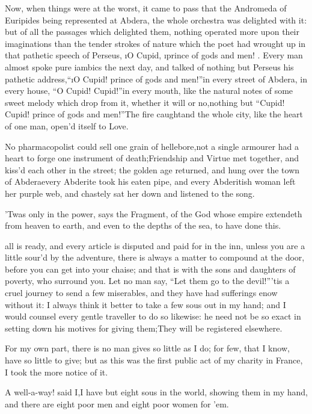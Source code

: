 \documentclass[twoside]{article}
\begin{document}
Now, when things were at the worst, it came to pass that the Andromeda of
Euripides being represented at Abdera, the whole orchestra was delighted
with it: but of all the passages which delighted them, nothing operated
more upon their imaginations than the tender strokes of nature which the
poet had wrought up in that pathetic speech of Perseus, \i{O Cupid},
\i{prince of gods and men}! \etc.  Every man almost spoke pure iambics the
next day, and talked of nothing but Perseus his pathetic address,\tsk “\i{O
Cupid! prince of gods and men}!”\tsk in every street of Abdera, in every
house, “O Cupid!  Cupid!”\tsk in every mouth, like the natural notes of some
sweet melody which drop from it, whether it will or no,\tsk nothing but
“Cupid! Cupid! prince of gods and men!”\tsk The fire caught\tsk and the whole
city, like the heart of one man, open’d itself to Love.

No pharmacopolist could sell one grain of hellebore,\tsk not a single
armourer had a heart to forge one instrument of death;\tsk Friendship and
Virtue met together, and kiss’d each other in the street; the golden age
returned, and hung over the town of Abdera\tsk every Abderite took his eaten
pipe, and every Abderitish woman left her purple web, and chastely sat
her down and listened to the song.

’Twas only in the power, says the Fragment, of the God whose empire
extendeth from heaven to earth, and even to the depths of the sea, to
have done this.






 all is ready, and every article is disputed and paid for in the inn,
unless you are a little sour’d by the adventure, there is always a matter
to compound at the door, before you can get into your chaise; and that is
with the sons and daughters of poverty, who surround you.  Let no man
say, “Let them go to the devil!”\tsk ’tis a cruel journey to send a few
miserables, and they have had sufferings enow without it: I always think
it better to take a few sous out in my hand; and I would counsel every
gentle traveller to do so likewise: he need not be so exact in setting
down his motives for giving them;\tsk They will be registered elsewhere.

For my own part, there is no man gives so little as I do; for few, that I
know, have so little to give; but as this was the first public act of my
charity in France, I took the more notice of it.

A well-a-way! said I,\tsk I have but eight sous in the world, showing them in
my hand, and there are eight poor men and eight poor women for ’em.
\end{document}
